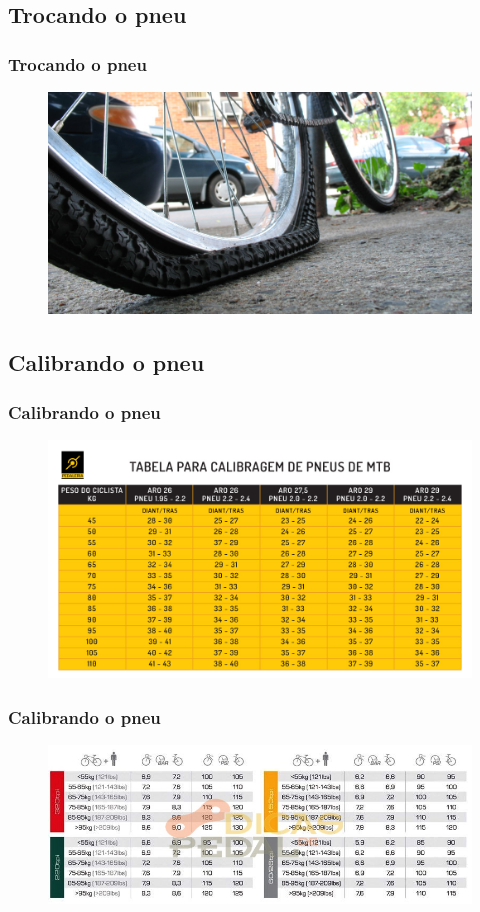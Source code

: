 \documentclass{beamer}
\begin{document}
	\begin{frame}
		\section{Trocando o pneu}
		\frametitle{Trocando o pneu}
		\begin{figure}[h]
			\centering
			\includegraphics[scale=0.7]{pneufurado.jpg}
		\end{figure}
	\end{frame}
	
	\begin{frame}
		\section{Calibrando o pneu}
		\frametitle{Calibrando o pneu}
		\begin{figure}[h]
			\centering
			\includegraphics[scale=0.3]{mtb.jpg}
		\end{figure}
	\end{frame}
	
	\begin{frame}
		\frametitle{Calibrando o pneu}
		\begin{figure}[h]
			\centering
			\includegraphics[scale=0.5]{speed.jpg}
		\end{figure}
	\end{frame}
	
\end{document}

